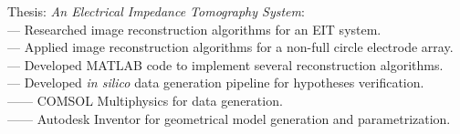 \begin{itemize}[leftmargin=0in, label={}]
    \small{\item{
        {Thesis: \textit{An Electrical Impedance Tomography System}:}\\
        {— Researched image reconstruction algorithms for an EIT system.}\\
        {— Applied image reconstruction algorithms for a non-full circle electrode array.}\\
        {— Developed MATLAB code to implement several reconstruction algorithms.}\\
        {— Developed \textit{in silico} data generation pipeline for hypotheses verification.}\\
        {—— COMSOL Multiphysics for data generation.}\\
        {—— Autodesk Inventor for geometrical model generation and parametrization.}
    }}
\end{itemize}